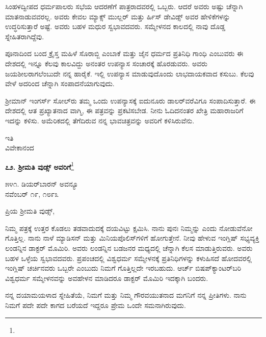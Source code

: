 ಸಿಂಹಳದ್ವೀಪದ ಧರ್ಮಪಾಲರು ಸಭೆಯ ಆದರಣೆಗೆ ಪಾತ್ರರಾದವರಲ್ಲಿ ಒಬ್ಬರು. ಆದರೆ ಅವರು ಅಷ್ಟು ಚೆನ್ನಾಗಿ ಮಾತನಾಡುವವರಲ್ಲ. ಅವರು ಕೇವಲ ಮ್ಯಾಕ್ಸ್ ಮುಲ್ಲರ್ ಮತ್ತು ರ್ಹಿಸ್ ಡೇವಿಡ್ಸ್ ಅವರ ಹೇಳಿಕೆಗಳನ್ನು ಉದ್ಧರಿಸುತ್ತಾರೆ ಅಷ್ಟೆ. ಅವರು ಬಹಳ ಮಧುರ ಸ್ವಭಾವದವರು. ಸಮ್ಮೇಳನದ ಕಾಲದಲ್ಲಿ ನಾವು ದೊಡ್ಡ ಸ್ನೇಹಿತರಾಗಿದ್ದೆವು.

ಪೂನಾದಿಂದ ಬಂದ ಕ್ರೈಸ್ತ ಮಹಿಳೆ ಸೊರಾಬ್ಜಿ ಎಂಬಾಕೆ ಮತ್ತು ಜೈನ ಧರ್ಮದ ಪ್ರತಿನಿಧಿ ಗಾಂಧಿ ಎಂಬುವರು ಈ ದೇಶದಲ್ಲಿ ಇನ್ನೂ ಕೆಲವು ಕಾಲವಿದ್ದು ಅನಂತರ ಉಪನ್ಯಾಸ ಸಂಚಾರಕ್ಕೆ ಹೊರಡುವರು. ಅವರು ಜಯಶೀಲರಾಗಲೆಂಬುದೇ ನನ್ನ ಹಾರೈಕೆ. ಇಲ್ಲಿ ಉಪನ್ಯಾಸ ಮಾಡುವುದೊಂದು ಲಾಭದಾಯಕವಾದ ಕಸುಬು. ಕೆಲವು ವೇಳೆ ಅದರಿಂದ ಚೆನ್ನಾಗಿ ಸಂಪಾದನೆಯಾಗುವುದು.

ಶ‍್ರೀಮಾನ್ ಇಂಗ‌ರ್ಸ್ ಸೋಲ್‌ರು ತಮ್ಮ ಒಂದು ಉಪನ್ಯಾಸಕ್ಕೆ ಐದುನೂರು ಡಾಲರ್‌ವರೆವಿಗೂ ಸಂಪಾದಿಸುತ್ತಾರೆ. ಈ ದೇಶದಲ್ಲಿ ಆತ ಪ್ರಖ್ಯಾತನಾದ ವಾಗ್ಮಿ, ಈ ಪತ್ರವನ್ನು ಪ್ರಕಟಿಸಬೇಡ. ನೀನು ಓದಿದನಂತರ ಖೇತ್ರಿ ಮಹಾರಾಜರಿಗೆ ಇದನ್ನು ಕಳಿಸು. ಅಮೆರಿಕದಲ್ಲಿ ತೆಗೆದಿರುವ ನನ್ನ ಭಾವಚಿತ್ರವನ್ನು ಅವರಿಗೆ ಕಳಿಸಿರುವೆನು.

\vspace{-0.5cm}

{\flushright
ಇತಿ\\ವಿವೇಕಾನಂದ\par}

\begin{center}
\textbf{೭೨. ಶ‍್ರೀಮತಿ ವುಡ್ಸ್ ಅವರಿಗೆ}\footnote{}
\end{center}

\vspace{-0.7cm}

\begin{flushright}
೫೪೧. ಡಿಯರ್‌ಬಾರನ್ ಅವನ್ಯೂ\\ನವೆಂಬರ್ ೧೯, ೧೮೯೩
\end{flushright}

\vspace{-0.5cm}

\noindent
ಪ್ರಿಯ ಶ‍್ರೀಮತಿ ವುಡ್ಸ್,

ನಿಮ್ಮ ಪತ್ರಕ್ಕೆ ಉತ್ತರ ಕೊಡಲು ತಡವಾದುದಕ್ಕೆ ದಯವಿಟ್ಟು ಕ್ಷಮಿಸಿ. ನಾನು ಪುನಃ ನಿಮ್ಮನ್ನು ಎಂದು ನೋಡುವೆನೋ ಗೊತ್ತಿಲ್ಲ. ನಾನು ನಾಳೆ ಮ್ಯಾಡಿಸನ್ ಮತ್ತು ಮಿನಿಯಪೊಲಿಸ್‌ಗಳಿಗೆ ಹೋಗುತ್ತೇನೆ. ನೀವು ಹೇಳುವ ಇಂಗ್ಲಿಷ್ ಸಭ್ಯವ್ಯಕ್ತಿ ಲಂಡನ್ನಿನ ಡಾಕ್ಟರ್ ಮೊಮಿರಿ. ಅವರು ಲಂಡನ್ನಿನ ಬಡಜನರ ಮಧ್ಯದಲ್ಲಿ ಚೆನ್ನಾಗಿ ಕೆಲಸ ಮಾಡುತ್ತಿರುವರು. ಅವರು ಬಹಳ ಒಳ್ಳೆಯ ಸ್ವಭಾವದವರು. ಪ್ರಪಂಚದಲ್ಲಿ ವಿಶ್ವಧರ್ಮ ಸಮ್ಮೇಳನಕ್ಕೆ ಪ್ರತಿನಿಧಿಗಳನ್ನು ಕಳುಹಿಸದೆ ಹೋದವರಲ್ಲಿ ಇಂಗ್ಲಿಷ್ ಚರ್ಚಿನವರು ಒಬ್ಬರೇ ಎಂಬುದು ನಿಮಗೆ ಗೊತ್ತಿಲ್ಲದೇ ಇರಬಹುದು. ಆರ್ಚ್ ಬಿಷಪ್‌ಕ್ಯಾಂಟರ್‌ಬರಿ ವಿಶ್ವಧರ್ಮ ಸಮ್ಮೇಳನವನ್ನು ಅವಹೇಳನ ಮಾಡಿದರೂ ಡಾಕ್ಟರ್ ಮೊಮಿರಿ ಇದಕ್ಕಾಗಿ ಬಂದರು.

ನನ್ನ ದಯಾಮಯಳಾದ ಸ್ನೇಹಿತೆಯೆ, ನಿಮಗೆ ಮತ್ತು ನಿಮ್ಮ ಗೌರವಯುತನಾದ ಮಗನಿಗೆ ನನ್ನ ಪ್ರೀತಿಗಳು. ನಾನು ನಿಮಗೆ ಪದೇ ಪದೇ ಕಾಗದ ಬರೆಯದೆ ಇದ್ದರೂ ಪ್ರೇಮ ಒಂದೇ ಸಮನಾಗಿರುವುದು.

